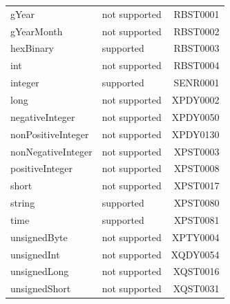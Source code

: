 \begin{table}
\begin{tabular}{|l|l|r|}
		\cline{1-2}
		gYear                 & not supported    & RBST0001                                              \\ 
		\cline{1-2}
		gYearMonth            & not supported    & RBST0002                                              \\ 
		\cline{1-2}
		hexBinary             & supported        & RBST0003                                              \\ 
		\cline{1-2}
		int                   & not supported    & RBST0004                                              \\ 
		\cline{1-2}
		integer               & supported        & SENR0001                                              \\ 
		\cline{1-2}
		long                  & not supported    & XPDY0002                                              \\ 
		\cline{1-2}
		negativeInteger       & not supported    & XPDY0050                                              \\ 
		\cline{1-2}
		nonPositiveInteger    & not supported    & XPDY0130                                              \\ 
		\cline{1-2}
		nonNegativeInteger    & not supported    & XPST0003                                              \\ 
		\cline{1-2}
		positiveInteger       & not supported    & XPST0008                                              \\ 
		\cline{1-2}
		short                 & not supported    & XPST0017                                              \\ 
		\cline{1-2}
		string                & supported        & XPST0080                                              \\ 
		\cline{1-2}
		time                  & supported        & XPST0081                                              \\ 
		\cline{1-2}
		unsignedByte          & not supported    & XPTY0004                                              \\ 
		\cline{1-2}
		unsignedInt           & not supported    & XQDY0054                                              \\ 
		\cline{1-2}
		unsignedLong          & not supported    & XQST0016                                              \\ 
		\cline{1-2}
		unsignedShort         & not supported    & XQST0031                                              \\ 

\end{tabular}
\end{table}
